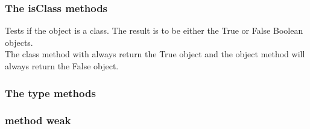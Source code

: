 \subsubsection {The isClass methods}

Tests if the object is a class. The result is to be either the
True or False Boolean objects.\\

The class method with always return the True object and the object method will
always return the False object.

\hfill
\subsubsection {The type methods}

\hfill
\subsubsection {method weak}
